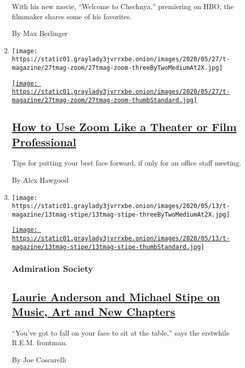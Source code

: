 \begin{enumerate}
\begin{enumerate}
    With his new movie, ``Welcome to Chechnya,'' premiering on HBO, the
    filmmaker shares some of his favorites.

    By Max Berlinger
  \item
    \texttt{[image: https://static01.graylady3jvrrxbe.onion/images/2020/05/27/t-magazine/27tmag-zoom/27tmag-zoom-threeByTwoMediumAt2X.jpg]}

    \href{/2020/05/27/t-magazine/zoom-tips-coronavirus.html}{\texttt{[image: https://static01.graylady3jvrrxbe.onion/images/2020/05/27/t-magazine/27tmag-zoom/27tmag-zoom-thumbStandard.jpg]}}

    \hypertarget{how-to-use-zoom-like-a-theater-or-film-professional}{%
    \subsection{\texorpdfstring{\href{/2020/05/27/t-magazine/zoom-tips-coronavirus.html}{How
    to Use Zoom Like a Theater or Film
    Professional}}{How to Use Zoom Like a Theater or Film Professional}}\label{how-to-use-zoom-like-a-theater-or-film-professional}}

    Tips for putting your best face forward, if only for an office staff
    meeting.

    By Alex Hawgood
  \item
    \texttt{[image: https://static01.graylady3jvrrxbe.onion/images/2020/05/13/t-magazine/13tmag-stipe/13tmag-stipe-threeByTwoMediumAt2X.jpg]}

    \href{/2020/05/14/t-magazine/michael-stipe-laurie-anderson.html}{\texttt{[image: https://static01.graylady3jvrrxbe.onion/images/2020/05/13/t-magazine/13tmag-stipe/13tmag-stipe-thumbStandard.jpg]}}

    \hypertarget{admiration-society}{%
    \subsubsection{Admiration Society}\label{admiration-society}}

    \hypertarget{laurie-anderson-and-michael-stipe-on-music-art-and-new-chapters}{%
    \subsection{\texorpdfstring{\href{/2020/05/14/t-magazine/michael-stipe-laurie-anderson.html}{Laurie
    Anderson and Michael Stipe on Music, Art and New
    Chapters}}{Laurie Anderson and Michael Stipe on Music, Art and New Chapters}}\label{laurie-anderson-and-michael-stipe-on-music-art-and-new-chapters}}

    ``You've got to fall on your face to sit at the table,'' says the
    erstwhile R.E.M. frontman.

    By Joe Coscarelli
  \end{enumerate}
\end{enumerate}

